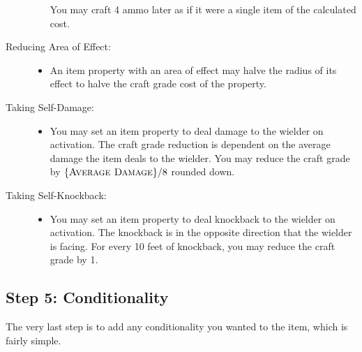 \begin{description}
\begin{itemize}
		You may craft 4 ammo later as if it were a single item of the calculated cost.
	\end{itemize}
	\item[Reducing Area of Effect:] \hfill
	\begin{itemize}
		\item An item property with an area of effect may halve the radius of its effect to halve the craft grade cost of the property.
	\end{itemize}
	\item[Taking Self-Damage:] \hfill
	\begin{itemize}
		\item You may set an item property to deal damage to the wielder on activation. The craft grade reduction is dependent on the average damage the item deals to the wielder. You may reduce the craft grade by $\{ \textsc{Average Damage} \}/8$ rounded down.
	\end{itemize}
	\item[Taking Self-Knockback:] \hfill
	\begin{itemize}
		\item You may set an item property to deal knockback to the wielder on activation. The knockback is in the opposite direction that the wielder is facing. For every 10 feet of knockback, you may reduce the craft grade by 1.
	\end{itemize}
\end{description}

\subsection{Step 5: Conditionality}
The very last step is to add any conditionality you wanted to the item, which is fairly simple.

